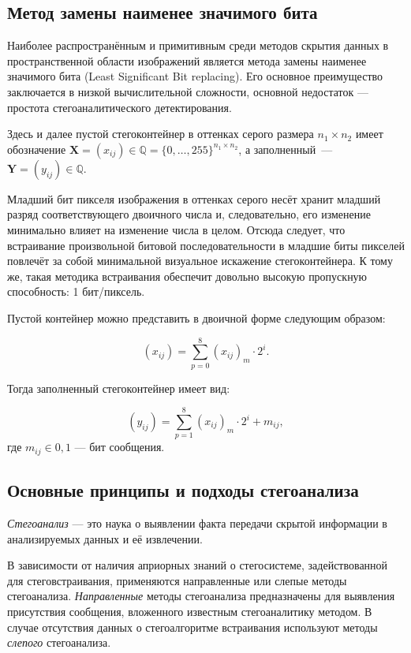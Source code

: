 \subsection{Метод замены наименее значимого бита}

Наиболее распространённым и примитивным среди методов скрытия данных в пространственной области изображений является метода замены наименее значимого бита (Least Significant Bit replacing). Его основное преимущество заключается в низкой вычислительной сложности, основной недостаток --- простота стегоаналитического детектирования.

Здесь и далее пустой стегоконтейнер в оттенках серого размера $ {n_1 \times n_2} $ имеет обозначение $ \mathbf{X} = (x_{ij}) \in \mathbb{Q} = \{0, \dotsc, 255\}^{n_1 \times n_2} $, а заполненный~--- $ \mathbf{Y} = (y_{ij}) \in \mathbb{Q} $.

Младший бит пикселя изображения в оттенках серого несёт хранит младший разряд соответствующего двоичного числа и, следовательно, его изменение минимально влияет на изменение числа в целом. Отсюда следует, что встраивание произвольной битовой последовательности в младшие биты пикселей повлечёт за собой минимальной визуальное искажение стегоконтейнера. К тому же, такая методика встраивания обеспечит довольно высокую пропускную способность: 1 бит/пиксель.

Пустой контейнер можно представить в двоичной форме следующим образом:

\begin{equation*}
(x_{ij}) = \sum_{p = 0}^8 (x_{ij})_m \cdot 2^i.
\end{equation*}

Тогда заполненный стегоконтейнер имеет вид:

\begin{equation*}
(y_{ij}) = \sum_{p = 1}^8 (x_{ij})_m \cdot 2^i + m_{ij},
\end{equation*}
где $ m_{ij} \in {0, 1} $ --- бит сообщения.

\subsection{Основные принципы и подходы стегоанализа}

\textit{Стегоанализ} — это наука о выявлении факта передачи скрытой информации в анализируемых данных и её извлечении.

В зависимости от наличия априорных знаний о стегосистеме, задействованной для стеговстраивания, применяются направленные или слепые методы стегоанализа. \textit{Направленные} методы стегоанализа предназначены для выявления присутствия сообщения, вложенного известным стегоаналитику методом. В случае отсутствия данных о стегоалгоритме встраивания используют методы \textit{слепого} стегоанализа.

